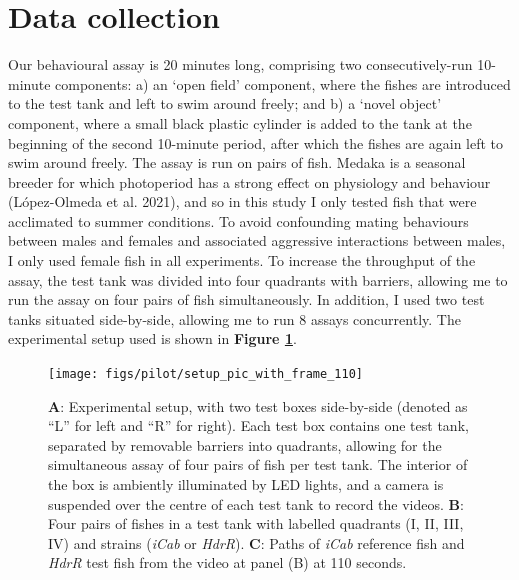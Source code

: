 \documentclass[
]{book}
\begin{document}
\hypertarget{pilot-data-collection}{%
\section{Data collection}\label{pilot-data-collection}}

Our behavioural assay is 20 minutes long, comprising two consecutively-run 10-minute components: a) an `open field' component, where the fishes are introduced to the test tank and left to swim around freely; and b) a `novel object' component, where a small black plastic cylinder is added to the tank at the beginning of the second 10-minute period, after which the fishes are again left to swim around freely. The assay is run on pairs of fish. Medaka is a seasonal breeder for which photoperiod has a strong effect on physiology and behaviour (López-Olmeda et al. 2021), and so in this study I only tested fish that were acclimated to summer conditions. To avoid confounding mating behaviours between males and females and associated aggressive interactions between males, I only used female fish in all experiments. To increase the throughput of the assay, the test tank was divided into four quadrants with barriers, allowing me to run the assay on four pairs of fish simultaneously. In addition, I used two test tanks situated side-by-side, allowing me to run 8 assays concurrently. The experimental setup used is shown in \textbf{Figure \ref{fig:assay-setup}}.



\begin{figure}
\texttt{[image: figs/pilot/setup\_pic\_with\_frame\_110]} \caption{\textbf{A}: Experimental setup, with two test boxes side-by-side (denoted as ``L'' for left and ``R'' for right). Each test box contains one test tank, separated by removable barriers into quadrants, allowing for the simultaneous assay of four pairs of fish per test tank. The interior of the box is ambiently illuminated by LED lights, and a camera is suspended over the centre of each test tank to record the videos. \textbf{B}: Four pairs of fishes in a test tank with labelled quadrants (I, II, III, IV) and strains (\emph{iCab} or \emph{HdrR}). \textbf{C}: Paths of \emph{iCab} reference fish and \emph{HdrR} test fish from the video at panel (B) at 110 seconds.}\label{fig:assay-setup}
\end{figure}
\end{document}

